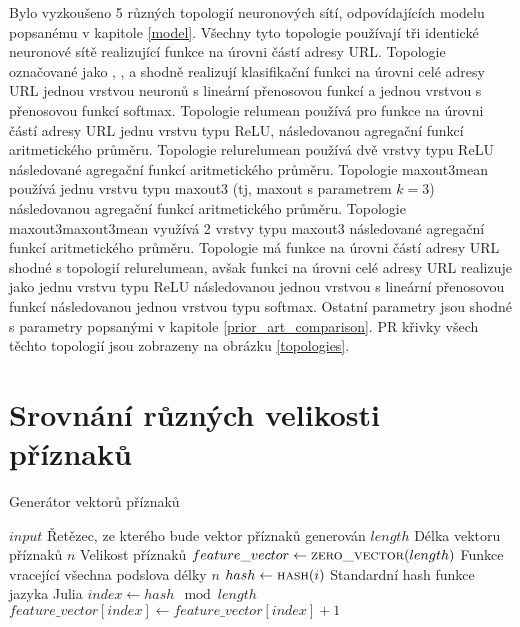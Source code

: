 Bylo vyzkoušeno 5 různých topologií neuronových sítí, odpovídajících modelu popsanému v kapitole \ref{model}. Všechny tyto topologie používají tři identické neuronové sítě realizující funkce na úrovni částí adresy URL. Topologie označované jako , ,  a  shodně realizují klasifikační funkci na úrovni celé adresy URL jednou vrstvou neuronů s lineární přenosovou funkcí a jednou vrstvou s přenosovou funkcí softmax. Topologie relumean používá pro funkce na úrovni částí adresy URL jednu vrstvu typu ReLU, následovanou agregační funkcí aritmetického průměru. Topologie relurelumean používá dvě vrstvy typu ReLU následované agregační funkcí aritmetického průměru. Topologie maxout3mean používá jednu vrstvu typu maxout3 (tj, maxout s parametrem \( k = 3 \)) následovanou agregační funkcí aritmetického průměru. Topologie maxout3maxout3mean využívá 2 vrstvy typu maxout3 následované agregační funkcí aritmetického průměru. Topologie  má funkce na úrovni částí adresy URL shodné s topologií relurelumean, avšak funkci na úrovni celé adresy URL realizuje jako jednu vrstvu typu ReLU následovanou jednou vrstvou s lineární přenosovou funkcí následovanou jednou vrstvou typu softmax. Ostatní parametry jsou shodné s parametry popsanými v kapitole \ref{prior_art_comparison}. PR křivky všech těchto topologií jsou zobrazeny na obrázku \ref{topologies}. 


\section{Srovnání různých velikosti příznaků}

\begin{algorithm}
	\caption{Generátor vektorů příznaků}
	\label{feature_generator}
	\begin{algorithmic}
		\Require $ input $ \Comment Řetězec, ze kterého bude vektor příznaků generován
		\Require $ length $ \Comment Délka vektoru příznaků
		\Require $ n $ \Comment Velikost příznaků
		\Statex
		\State $ feature\_vector \gets \Call{zero\_vector}{length} $
		 \Comment Funkce vracející všechna podslova délky $ n $
			\State $ hash \gets \Call{hash}{i} $ \Comment Standardní hash funkce jazyka Julia
			\State $ index \gets hash \mod length $
			\State $ feature\_vector \left[ index \right] \gets feature\_vector \left[ index \right] + 1 $
		\EndFor
	\end{algorithmic}
\end{algorithm}


